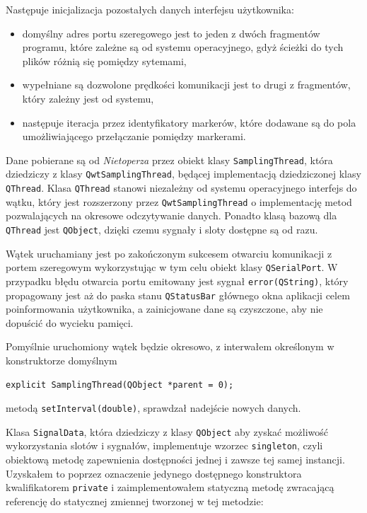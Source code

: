 Następuje inicjalizacja pozostałych danych interfejsu użytkownika:
\begin{itemize}
  \item domyślny adres portu szeregowego \ppauza jest to jeden z dwóch fragmentów programu, które zależne są od systemu operacyjnego, gdyż ścieżki do tych plików różnią się pomiędzy sytemami,
  \item wypełniane są dozwolone prędkości komunikacji \ppauza jest to drugi z fragmentów, który zależny jest od systemu,
  \item następuje iteracja przez identyfikatory markerów, które dodawane są do pola umożliwiającego przełączanie pomiędzy markerami.
\end{itemize}

Dane pobierane są od \textsl{Nietoperza} przez obiekt klasy \verb|SamplingThread|, która dziedziczy z klasy \verb|QwtSamplingThread|, będącej implementacją dziedziczonej klasy \verb|QThread|. Klasa \verb|QThread| stanowi niezależny od systemu operacyjnego interfejs do wątku, który jest rozszerzony przez \verb|QwtSamplingThread| o implementację metod pozwalających na okresowe odczytywanie danych. Ponadto klasą bazową dla \verb|QThread| jest \verb|QObject|, dzięki czemu sygnały i sloty dostępne są od razu.

Wątek uruchamiany jest po zakończonym sukcesem otwarciu komunikacji z portem szeregowym wykorzystując w tym celu obiekt klasy \verb|QSerialPort|. W przypadku błędu otwarcia portu emitowany jest sygnał \verb|error(QString)|, który propagowany jest aż do paska stanu \verb|QStatusBar| głównego okna aplikacji celem poinformowania użytkownika, a zainicjowane dane są czyszczone, aby nie dopuścić do wycieku pamięci.

Pomyślnie uruchomiony wątek będzie okresowo, z interwałem określonym w konstruktorze domyślnym
\begin{verbatim}
explicit SamplingThread(QObject *parent = 0);
\end{verbatim}
metodą \verb|setInterval(double)|, sprawdzał nadejście nowych danych.

Klasa \verb|SignalData|, która dziedziczy z klasy \verb|QObject| aby zyskać możliwość wykorzystania slotów i sygnałów, implementuje wzorzec \verb|singleton|, czyli obiektową metodę zapewnienia dostępności jednej i zawsze tej samej instancji. Uzyskałem to poprzez oznaczenie jedynego dostępnego konstruktora kwalifikatorem \verb|private| i zaimplementowałem statyczną metodę zwracającą referencję do statycznej zmiennej tworzonej w tej metodzie:
\begin{verbatimtab}
class SignalData : public QObject
{
	Q_OBJECT
	SignalData();
public:
	static SignalData &instance();
\end{verbatimtab}

